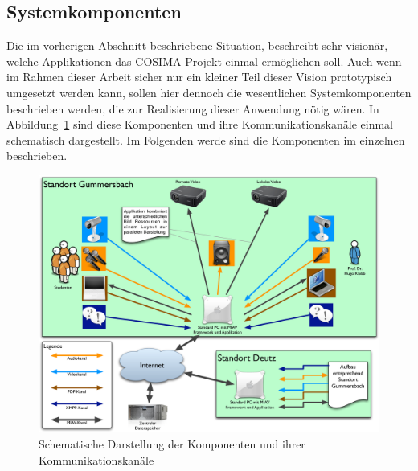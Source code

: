 
\subsection{Systemkomponenten} %
\label{sub:systemkomponenten}

  Die im vorherigen Abschnitt beschriebene Situation, beschreibt sehr visionär, welche Applikationen das COSIMA-Projekt einmal ermöglichen soll. Auch wenn im Rahmen dieser Arbeit sicher nur ein kleiner Teil dieser Vision prototypisch umgesetzt werden kann, sollen hier dennoch die wesentlichen Systemkomponenten beschrieben werden, die zur Realisierung dieser Anwendung nötig wären. In Abbildung~\ref{fig:images_Hardware_und_Kanaele} sind diese Komponenten und ihre Kommunikationskanäle einmal schematisch dargestellt. Im Folgenden werde sind die Komponenten im einzelnen beschrieben.

  \begin{figure}[ht]
    \centering
      \includegraphics[width=.9\textwidth]{images/Hardware_und_Kanaele.pdf}
    \caption{Schematische Darstellung der Komponenten und ihrer Kommunikationskanäle}
    \label{fig:images_Hardware_und_Kanaele}
  \end{figure}
  
